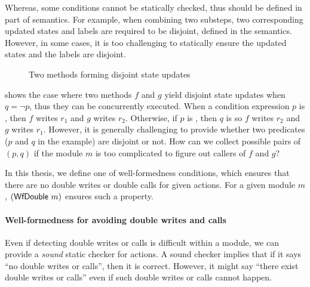 Whereas, some conditions cannot be statically checked, thus should be
defined in part of semantics. For example, when combining two
substeps, two corresponding updated states and labels are required to
be disjoint, defined in the \Substeps{} semantics. However, in some
cases, it is too challenging to statically ensure the updated states
and the labels are disjoint.

\begin{figure}[h]
  \caption{Two methods forming disjoint state updates}
  \label{ex-two-methods-disjoint}
\end{figure}

 shows the case where two methods $f$
and $g$ yield disjoint state updates when $q = \neg p$, thus they can
be concurrently executed. When a condition expression $p$ is \btrue{},
then $f$ writes $r_1$ and $g$ writes $r_2$. Otherwise, if $p$ is
\bfalse{}, then $q$ is \btrue{} so $f$ writes $r_2$ and $g$ writes
$r_1$. However, it is generally challenging to provide whether two
predicates ($p$ and $q$ in the example) are disjoint or not. How can
we collect possible pairs of $(p, q)$ if the module $m$ is too
complicated to figure out callers of $f$ and $g$?

In this thesis, we define one of well-formedness conditions, which
ensures that there are no double writes or double calls for given
actions. For a given module $m$, $(\textsf{WfDouble}\ m)$ ensures such a
property.

\paragraph{Well-formedness for avoiding double writes and calls}

Even if detecting double writes or calls is difficult within a module,
we can provide a \emph{sound} static checker for actions. A sound
checker implies that if it says ``no double writes or calls'', then it
is correct. However, it might say ``there exist double writes or
calls'' even if such double writes or calls cannot happen.

